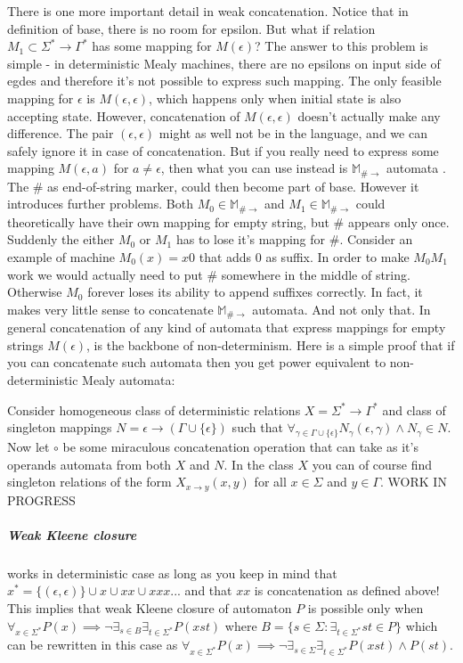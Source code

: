 \documentclass[12pt]{article}
\begin{document}
There is one more important detail in weak concatenation. Notice that in definition of base, there is no room for epsilon. But what if relation $M_1 \subset \Sigma^* \rightarrow \Gamma^*$ has some mapping for $M(\epsilon)$? The answer to this problem is simple - in deterministic Mealy machines, there are no epsilons on input side of egdes and therefore it's not possible to express such mapping. The only feasible mapping for $\epsilon$ is $M(\epsilon,\epsilon)$, which happens only when initial state is also accepting state. However, concatenation of $M(\epsilon,\epsilon)$ doesn't actually make any difference. The pair $(\epsilon,\epsilon)$ might as well not be in the language, and we can safely ignore it in case of concatenation.  But if you really need to express some mapping $M(\epsilon,a)$ for $a\ne\epsilon$, then what you can use instead is $\mathbb{M}_{\#\rightarrow}$ automata . The $\#$ as end-of-string marker,  could then become part of base. However it introduces further problems. Both $M_0 \in \mathbb{M}_{\#\rightarrow}$ and $M_1 \in \mathbb{M}_{\#\rightarrow}$ could theoretically have their own mapping for empty string, but $\#$ appears only once. Suddenly the either $M_0$ or $M_1$ has to lose it's mapping for $\#$. Consider an example of machine $M_0(x)=x0$ that adds 0 as suffix. In order to make $M_0M_1$ work we would actually need to put $\#$ somewhere in the middle of string. Otherwise $M_0$ forever loses its ability to append suffixes correctly. In fact, it makes very little sense to concatenate $\mathbb{M}_{\#\rightarrow}$ automata. And not only that. In general concatenation of any kind of automata that express mappings for empty strings $M(\epsilon)$, is the backbone of non-determinism. Here is a simple proof that if you can concatenate such automata then you get power equivalent to non-deterministic Mealy automata:


Consider homogeneous class of deterministic relations $X = \Sigma^* \rightarrow \Gamma^*$ and class of singleton mappings $N = \epsilon \rightarrow (\Gamma\cup\{\epsilon\})$ such that $\forall_{\gamma\in\Gamma\cup\{\epsilon\}}N_\gamma(\epsilon,\gamma) \wedge N_\gamma  \in N$. Now let $\circ$ be some miraculous concatenation operation that can take as it's operands automata from both $X$ and $N$. In the class $X$ you can of course find singleton relations of the form $X_{x\rightarrow y}(x,y)$ for all $x\in \Sigma$ and $y \in \Gamma$. WORK IN PROGRESS



\subparagraph{Weak Kleene closure}  works in deterministic case as long as you keep in mind that $x^* = \{(\epsilon,\epsilon) \} \cup x \cup xx \cup xxx ...$ and that $xx$ is concatenation as defined above! This implies that weak Kleene closure of automaton $P$ is possible only when $\forall_{x\in \Sigma^*} P(x) \implies \neg \exists_{s\in B} \exists_{t\in\Sigma^*} P(xst)$ where $B = \{s\in\Sigma : \exists_{t\in\Sigma^*}st\in P\}$ which can be rewritten in this case as  $\forall_{x\in \Sigma^*} P(x) \implies \neg \exists_{s\in \Sigma} \exists_{t\in\Sigma^*} P(xst) \wedge P(st)$. 
\end{document}
